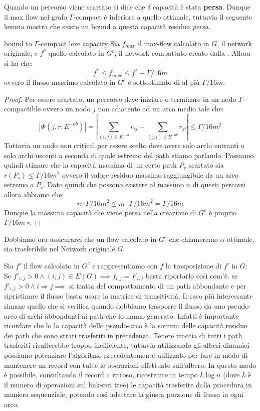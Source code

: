\documentclass[a4paper, 11pt]{report}
\newcommand*{\QED}{\null\nobreak\hfill\ensuremath{\square}}%
\newcommand{\gmm}{$\Gamma$}
\begin{document}
Quando un percorso viene scartato si dice che $\delta$ capacità è stata \textbf{persa}. 
Dunque il max flow nel grafo \gmm-compact è inferiore a quello ottimale, tuttavia il seguente lemma mostra che esiste un bound a questa capacità residua \textit{persa}.
\begin{lemma}[label = boundlose]{bound to \gmm-compact lose capacity}{}
    Sia $f_{max}$ il max-flow calcolato in $G$, il network originale, e $f^*$ quello calcolato in $G^c$, il network compattato creato dalla .
    Allora si ha che:
    \[f^*\le f_{max} \le f^* + \Gamma/16m\]
    ovvero il flusso massimo calcolato in $G^c$ è sottostimato di al più $\Gamma/16m$.
\end{lemma}
\begin{proof}
    Per essere scartato, un percorso deve iniziare o terminare in un nodo \gmm-compactible ovvero un nodo $j$ non adiacente ad un arco medio tale che:
    \[|\Phi (j, r, E^{-ab})| =\left | \sum_{(i,j)\in E^{-ab}} r_{ij}-\sum_{(j,i)\in E^{-ab}} r_{ji}\right |\le \Gamma/16m^2\]
    Tuttavia un nodo non critical per essere scelto deve avere solo archi entranti o solo archi uscenti a seconda di quale estremo del path stiamo parlando.
    Possiamo quindi stimare che la capacità massima di un certo path $P_s$ scartato sia $r(P_s) \le  \Gamma/16m^2$ ovvero il valore residuo massimo raggiungibile da un arco estremo a $P_s$.
    Dato quindi che possono esistere al massimo $n$ di questi percorsi allora abbiamo che: 
    \[n\cdot \Gamma/16m^2 \le m \cdot \Gamma/16m^2 = \Gamma/16m\]
    Dunque la massima capacità che viene persa nella creazione di $G^c$ è proprio $\Gamma/16m$ \QED.
\end{proof}

Dobbiamo ora assicurarci che un flow calcolato in $G^c$ che chiameremo $\alpha$-ottimale, sia trasferibile nel Network originale $G$.

Sia $f'$ il flow calcolato in $G^c$ e rappresentiamo con $f$ la trasposizione di $f'$ in $G$:\\
Se $f'_{i,j}> 0\land (i,j) \in E(G)\implies f_{i,j} = f'_{i,j}$ basta riportarlo così com'è.
se $f'_{i,j}> 0\land i \Rightarrow j \implies$ si tratta del compattamento di un path abbondante e per ripristinare il flusso basta usare la matrice di transitività.
Il caso più interessante rimane quello che si verifica quando dobbiamo trasporre il flusso da uno pseudo-arco di archi abbondanti ai path che lo hanno generato.
Infatti è importante ricordare che lo la capacità dello pseudo-arco è la somma delle capacità residue dei path che sono strati trasferiti in precedenza.
Tenere traccia di tutti i path trasferiti risulterebbe troppo inefficiente, tuttavia utilizzando gli alberi dinamici possiamo potenziare l'algoritmo precedentemente utilizzato per fare in modo di mantenere un record con tutte le operazioni effettuate sull'albero.
In questo modo è possibile, consultando il record a ritroso, ricostruire in tempo $k\log n$ (dove $k$ è  il numero di operazioni sul link-cut tree) le capacità trasferite dalla procedura in maniera sequenziale, potendo così adattare la giusta porzione di flusso in ogni arco.
\end{document}
